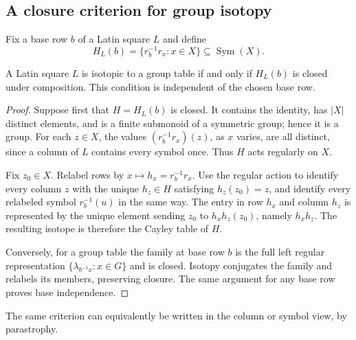 \subsection{A closure criterion for group isotopy}

Fix a base row $b$ of a Latin square $L$ and define
\[
 H_L(b)=\{r_b^{-1}r_x:x\in X\}\subseteq\operatorname{Sym}(X).
\]

\begin{proposition}\label{prop:closure}
A Latin square $L$ is isotopic to a group table if and only if $H_L(b)$ is
closed under composition.  This condition is independent of the chosen base
row.
\end{proposition}

\begin{proof}
Suppose first that $H=H_L(b)$ is closed.  It contains the identity, has
$|X|$ distinct elements, and is a finite submonoid of a symmetric group;
hence it is a group.  For each $z\in X$, the values
$(r_b^{-1}r_x)(z)$, as $x$ varies, are all distinct, since a column of $L$
contains every symbol once.  Thus $H$ acts regularly on $X$.

Fix $z_0\in X$.  Relabel rows by $x\mapsto h_x=r_b^{-1}r_x$.  Use the regular
action to identify every column $z$ with the unique $h_z\in H$ satisfying
$h_z(z_0)=z$, and identify every relabeled symbol $r_b^{-1}(u)$ in the same
way.  The entry in row $h_x$ and column $h_z$ is represented by the unique
element sending $z_0$ to $h_xh_z(z_0)$, namely $h_xh_z$.  The resulting
isotope is therefore the Cayley table of $H$.

Conversely, for a group table the family at base row $b$ is the full left
regular representation $\{\lambda_{b^{-1}x}:x\in G\}$ and is closed.
Isotopy conjugates the family and relabels its members, preserving closure.
The same argument for any base row proves base independence.
\end{proof}

The same criterion can equivalently be written in the column or symbol view,
by parastrophy.
